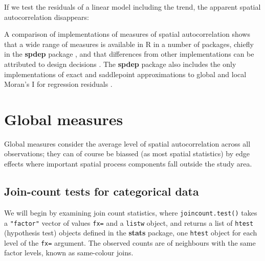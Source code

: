 \documentclass[]{book}
\newenvironment{Shaded}{\begin{snugshade}}{\end{snugshade}}
\newcommand{\CommentTok}[1]{\textcolor[rgb]{0.56,0.35,0.01}{\textit{#1}}}
\newcommand{\DataTypeTok}[1]{\textcolor[rgb]{0.13,0.29,0.53}{#1}}
\newcommand{\KeywordTok}[1]{\textcolor[rgb]{0.13,0.29,0.53}{\textbf{#1}}}
\newcommand{\NormalTok}[1]{#1}
\newcommand{\OperatorTok}[1]{\textcolor[rgb]{0.81,0.36,0.00}{\textbf{#1}}}
\newcommand{\StringTok}[1]{\textcolor[rgb]{0.31,0.60,0.02}{#1}}
\begin{document}
If we test the residuals of a linear model including the trend, the apparent spatial autocorrelation disappears:

\begin{Shaded}
\end{Shaded}

A comparison of implementations of measures of spatial autocorrelation shows that a wide range of measures is available in R in a number of packages, chiefly in the \textbf{spdep} package \citep{R-spdep}, and that differences from other implementations can be attributed to design decisions \citep{Bivand2018}. The \textbf{spdep} package also includes the only implementations of exact and saddlepoint approximations to global and local Moran's I for regression residuals \citep{tiefelsdorf:02, bivandetal:09}.

\hypertarget{global-measures}{%
\section{Global measures}\label{global-measures}}

Global measures consider the average level of spatial autocorrelation across all observations; they can of course be biassed (as most spatial statistics) by edge effects where important spatial process components fall outside the study area.

\hypertarget{join-count-tests-for-categorical-data}{%
\subsection{Join-count tests for categorical data}\label{join-count-tests-for-categorical-data}}

We will begin by examining join count statistics, where \texttt{joincount.test()} takes a \texttt{"factor"} vector of values \texttt{fx=} and a \texttt{listw} object, and returns a list of \texttt{htest} (hypothesis test) objects defined in the \textbf{stats} package, one \texttt{htest} object for each level of the \texttt{fx=} argument. The observed counts are of neighbours with the same factor levels, known as same-colour joins.
\end{document}
